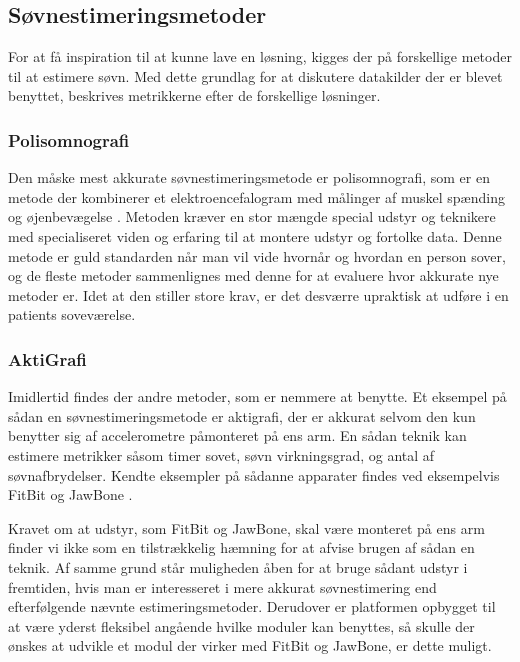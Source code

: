 \subsection{Søvnestimeringsmetoder}
For at få inspiration til at kunne lave en løsning, kigges der på forskellige metoder til at estimere søvn.
Med dette grundlag for at diskutere datakilder der er blevet benyttet, beskrives metrikkerne efter de forskellige løsninger.

\subsubsection{Polisomnografi}\label{sec:polysomnografi}
Den måske mest akkurate søvnestimeringsmetode er polisomnografi, som er en metode der kombinerer et elektroencefalogram med målinger af muskel spænding og øjenbevægelse \citep{misc:polysomnografi,misc:polysomnography}.
Metoden kræver en stor mængde special udstyr og teknikere med specialiseret viden og erfaring til at montere udstyr og fortolke data.
Denne metode er guld standarden når man vil vide hvornår og hvordan en person sover, og de fleste metoder sammenlignes med denne for at evaluere hvor akkurate nye metoder er. 
Idet at den stiller store krav, er det desværre upraktisk at udføre i en patients soveværelse.

\subsubsection{AktiGrafi}
Imidlertid findes der andre metoder, som er nemmere at benytte.
Et eksempel på sådan en søvnestimeringsmetode er aktigrafi, der er akkurat selvom den kun benytter sig af accelerometre påmonteret på ens arm.
En sådan teknik kan estimere metrikker såsom timer sovet, søvn virkningsgrad, og antal af søvnafbrydelser.
Kendte eksempler på sådanne apparater findes ved eksempelvis FitBit og JawBone \citep{misc:fitbitSleepTracking,misc:jawBoneSleepTracking}.

Kravet om at udstyr, som FitBit og JawBone, skal være monteret på ens arm finder vi ikke som en tilstrækkelig hæmning for at afvise brugen af sådan en teknik.
Af samme grund står muligheden åben for at bruge sådant udstyr i fremtiden, hvis man er interesseret i mere akkurat søvnestimering end efterfølgende nævnte estimeringsmetoder.
Derudover er platformen opbygget til at være yderst fleksibel angående hvilke moduler kan benyttes, så skulle der ønskes at udvikle et modul der virker med FitBit og JawBone, er dette muligt.

